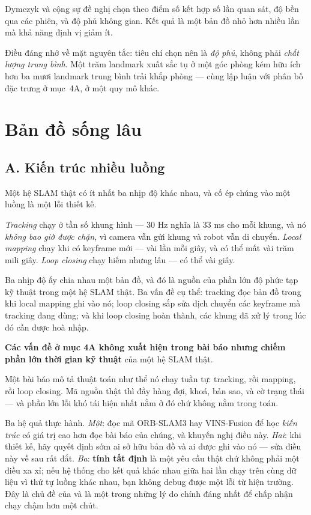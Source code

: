 \documentclass[../../vslam.tex]{subfiles}
\begin{document}
Dymczyk và cộng sự \cite{dymczyk2015gist} đề nghị chọn theo điểm số kết hợp số lần quan sát, độ bền qua các phiên, và độ phủ không gian. Kết quả là một bản đồ nhỏ hơn nhiều lần mà khả năng định vị giảm ít.

Điều đáng nhớ về mặt nguyên tắc: tiêu chí chọn nên là \emph{độ phủ}, không phải \emph{chất lượng trung bình}. Một trăm landmark xuất sắc tụ ở một góc phòng kém hữu ích hơn ba mươi landmark trung bình trải khắp phòng --- cùng lập luận với phân bố đặc trưng ở  mục~4A, ở một quy mô khác.

\section{Bản đồ sống lâu}

\subsection{A. Kiến trúc nhiều luồng}

Một hệ SLAM thật có ít nhất ba nhịp độ khác nhau, và cố ép chúng vào một luồng là một lỗi thiết kế.

\emph{Tracking} chạy ở tần số khung hình --- \(30\) Hz nghĩa là \(33\) ms cho mỗi khung, và nó \emph{không bao giờ được chặn}, vì camera vẫn gửi khung và robot vẫn di chuyển. \emph{Local mapping} chạy khi có keyframe mới --- vài lần mỗi giây, và có thể mất vài trăm mili giây. \emph{Loop closing} chạy hiếm nhưng lâu --- có thể vài giây.

Ba nhịp độ ấy chia nhau một bản đồ, và đó là nguồn của phần lớn độ phức tạp kỹ thuật trong một hệ SLAM thật. Ba vấn đề cụ thể: tracking đọc bản đồ trong khi local mapping ghi vào nó; loop closing sắp sửa dịch chuyển các keyframe mà tracking đang dùng; và khi loop closing hoàn thành, các khung đã xử lý trong lúc đó cần được hoà nhập.

\begin{cambay}
\textbf{Các vấn đề ở mục 4A không xuất hiện trong bài báo nhưng chiếm phần lớn thời gian kỹ thuật} của một hệ SLAM thật.

Một bài báo mô tả thuật toán như thể nó chạy tuần tự: tracking, rồi mapping, rồi loop closing. Mã nguồn thật thì đầy hàng đợi, khoá, bản sao, và cờ trạng thái --- và phần lớn lỗi khó tái hiện nhất nằm ở đó chứ không nằm trong toán.

Ba hệ quả thực hành. \emph{Một}: đọc mã ORB-SLAM3 hay VINS-Fusion để học \emph{kiến trúc} có giá trị cao hơn đọc bài báo của chúng, và  khuyến nghị điều này. \emph{Hai}: khi thiết kế, hãy quyết định sớm ai sở hữu bản đồ và ai được ghi vào nó --- sửa điều này về sau rất đắt. \emph{Ba}: \textbf{tính tất định} là một yêu cầu thật chứ không phải một điều xa xỉ; nếu hệ thống cho kết quả khác nhau giữa hai lần chạy trên cùng dữ liệu vì thứ tự luồng khác nhau, bạn không debug được một lỗi từ hiện trường. Đây là chủ đề của  và là một trong những lý do chính đáng nhất để chấp nhận chạy chậm hơn một chút.
\end{cambay}
\end{document}
